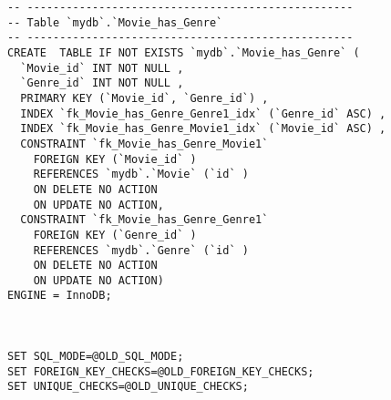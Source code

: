 \begin{lstlisting}[breaklines]
-- --------------------------------------------------
-- Table `mydb`.`Movie_has_Genre`
-- --------------------------------------------------
CREATE  TABLE IF NOT EXISTS `mydb`.`Movie_has_Genre` (
  `Movie_id` INT NOT NULL ,
  `Genre_id` INT NOT NULL ,
  PRIMARY KEY (`Movie_id`, `Genre_id`) ,
  INDEX `fk_Movie_has_Genre_Genre1_idx` (`Genre_id` ASC) ,
  INDEX `fk_Movie_has_Genre_Movie1_idx` (`Movie_id` ASC) ,
  CONSTRAINT `fk_Movie_has_Genre_Movie1`
    FOREIGN KEY (`Movie_id` )
    REFERENCES `mydb`.`Movie` (`id` )
    ON DELETE NO ACTION
    ON UPDATE NO ACTION,
  CONSTRAINT `fk_Movie_has_Genre_Genre1`
    FOREIGN KEY (`Genre_id` )
    REFERENCES `mydb`.`Genre` (`id` )
    ON DELETE NO ACTION
    ON UPDATE NO ACTION)
ENGINE = InnoDB;



SET SQL_MODE=@OLD_SQL_MODE;
SET FOREIGN_KEY_CHECKS=@OLD_FOREIGN_KEY_CHECKS;
SET UNIQUE_CHECKS=@OLD_UNIQUE_CHECKS;
\end{lstlisting}
\newpage